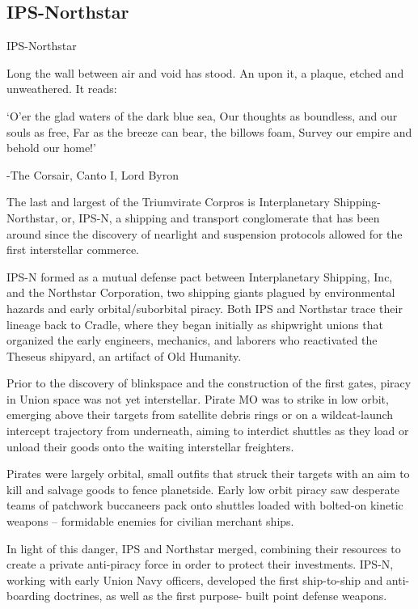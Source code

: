\subsection{IPS-Northstar}
IPS-Northstar

                 Long the wall between air and void has stood. An upon it, a plaque, etched
                 and unweathered. It reads:

                         ‘O’er the glad waters of the dark blue sea,
                         Our thoughts as boundless, and our souls as free,
                         Far as the breeze can bear, the billows foam,
                         Survey our empire and behold our home!’

                                 -The Corsair, Canto I, Lord Byron

The last and largest of the Triumvirate Corpros is Interplanetary Shipping-Northstar, or, IPS-N, a
shipping and transport conglomerate that has been around since the discovery of nearlight and
suspension protocols allowed for the first interstellar commerce.

IPS-N formed as a mutual defense pact between Interplanetary Shipping, Inc, and the Northstar
Corporation, two shipping giants plagued by environmental hazards and early orbital/suborbital
piracy. Both IPS and Northstar trace their lineage back to Cradle, where they began initially as
shipwright unions that organized the early engineers, mechanics, and laborers who reactivated
the Theseus shipyard, an artifact of Old Humanity.

Prior to the discovery of blinkspace and the construction of the first gates, piracy in Union space
was not yet interstellar. Pirate MO was to strike in low orbit, emerging above their targets from
satellite debris rings or on a wildcat-launch intercept trajectory from underneath, aiming to interdict
shuttles as they load or unload their goods onto the waiting interstellar freighters.

Pirates were largely orbital, small outfits that struck their targets with an aim to kill and salvage
goods to fence planetside. Early low orbit piracy saw desperate teams of patchwork buccaneers
pack onto shuttles loaded with bolted-on kinetic weapons -- formidable enemies for civilian
merchant ships.

In light of this danger, IPS and Northstar merged, combining their resources to create a private
anti-piracy force in order to protect their investments. IPS-N, working with early Union Navy
officers, developed the first ship-to-ship and anti-boarding doctrines, as well as the first purpose-
built point defense weapons.

